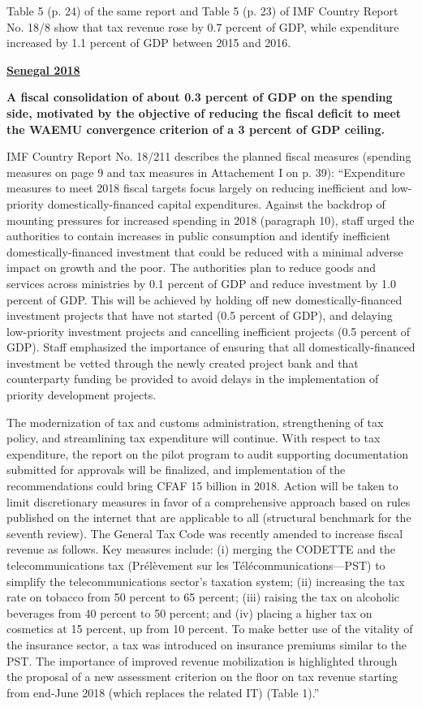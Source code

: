 Table 5 (p. 24) of the same report and Table 5 (p. 23) of IMF Country Report No. 18/8 show that tax revenue rose by 0.7 percent of GDP, while expenditure increased by 1.1 percent of GDP between 2015 and 2016. 

\textbf{\underline{Senegal 2018}}

\textbf{A fiscal consolidation of about 0.3 percent of GDP on the spending side, motivated by the objective of reducing the fiscal deficit to meet the WAEMU convergence criterion of a 3 percent of GDP ceiling.} 

IMF Country Report No. 18/211 describes the planned fiscal measures (spending measures on page 9 and tax measures in Attachement I on p. 39): “Expenditure measures to meet 2018 fiscal targets focus largely on reducing inefficient and low-priority domestically-financed capital expenditures. Against the backdrop of mounting pressures for increased spending in 2018 (paragraph 10), staff urged the authorities to contain increases in public consumption and identify inefficient domestically-financed investment that could be reduced with a minimal adverse impact on growth and the poor. The authorities plan to reduce goods and services across ministries by 0.1 percent of GDP and reduce investment by 1.0 percent of GDP. This will be achieved by holding off new domestically-financed investment projects that have not started (0.5 percent of GDP), and delaying low-priority investment projects and cancelling inefficient projects (0.5 percent of GDP). Staff emphasized the importance of ensuring that all domestically-financed investment be vetted through the newly created project bank and that counterparty funding be provided to avoid delays in the implementation of priority development projects.

The modernization of tax and customs administration, strengthening of tax policy, and streamlining tax expenditure will continue. With respect to tax expenditure, the report on the pilot program to audit supporting documentation submitted for approvals will be finalized, and implementation of the recommendations could bring CFAF 15 billion in 2018. Action will be taken to limit discretionary measures in favor of a comprehensive approach based on rules published on the internet that are applicable to all (structural benchmark for the seventh review). The General Tax Code was recently amended to increase fiscal revenue as follows. Key measures include: (i) merging the CODETTE and the telecommunications tax (Prélèvement sur les Télécommunications—PST) to simplify the telecommunications sector’s taxation system; (ii) increasing the tax rate on tobacco from 50 percent to 65 percent; (iii) raising the tax on alcoholic beverages from 40 percent to 50 percent; and (iv) placing a higher tax on cosmetics at 15 percent, up from 10 percent. To make better use of the vitality of the insurance sector, a tax was introduced on insurance premiums similar to the PST. The importance of improved revenue mobilization is highlighted through the proposal of a new assessment criterion on the floor on tax revenue starting from end-June 2018 (which replaces the related IT) (Table 1).”

